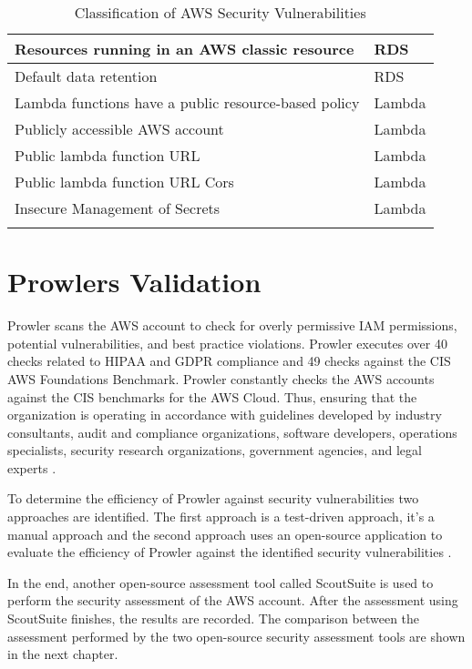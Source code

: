 \begin{longtable}{|p{12cm}|p{2.4cm}|}
    \hline
    Resources running in an AWS classic resource & RDS \\
    \hline
    Default data retention & RDS \\
    \hline
    Lambda functions have a public resource-based policy & Lambda \\
    \hline
    Publicly accessible AWS account & Lambda \\
    \hline
    Public lambda function URL & Lambda \\
    \hline
    Public lambda function URL Cors & Lambda \\
    \hline
    Insecure Management of Secrets & Lambda \\
    \hline

    \caption{Classification of AWS Security Vulnerabilities}
    \label{tab:classificationofsecurityvulnerabilities}
\end{longtable}

\section{Prowlers Validation}

\par Prowler scans the AWS account to check for overly permissive IAM permissions, potential vulnerabilities, and best practice violations.
Prowler executes over 40 checks related to HIPAA and GDPR compliance and 49 checks against the CIS AWS Foundations Benchmark.
Prowler constantly checks the AWS accounts against the CIS benchmarks for the AWS Cloud. Thus, ensuring that the organization is operating in accordance with guidelines developed by industry consultants, audit and compliance organizations, software developers, operations specialists, security research organizations, government agencies, and legal experts \cite{66}.

\par To determine the efficiency of Prowler against security vulnerabilities two approaches are identified.
The first approach is a test-driven approach, it’s a manual approach and the second approach uses an open-source application to evaluate the efficiency of Prowler against the identified security vulnerabilities \cite{37}.

\par In the end, another open-source assessment tool called ScoutSuite is used to perform the security assessment of the AWS account.
After the assessment using ScoutSuite finishes, the results are recorded.
The comparison between the assessment performed by the two open-source security
assessment tools are shown in the next chapter.

